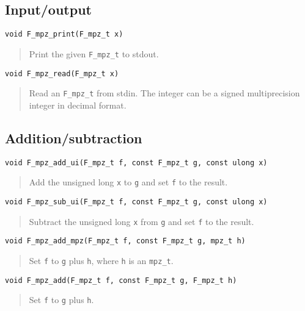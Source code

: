 \documentclass[a4paper,10pt]{article}
\newcommand{\code}{\lstinline}
\begin{document}
\subsection{Input/output}

\begin{lstlisting}
void F_mpz_print(F_mpz_t x)
\end{lstlisting}
\begin{quote}
Print the given \code{F_mpz_t} to stdout.
\end{quote}

\begin{lstlisting}
void F_mpz_read(F_mpz_t x)
\end{lstlisting}
\begin{quote}
Read an \code{F_mpz_t} from stdin. The integer can be a signed multiprecision integer in decimal format.
\end{quote}

\subsection{Addition/subtraction}

\begin{lstlisting}
void F_mpz_add_ui(F_mpz_t f, const F_mpz_t g, const ulong x)
\end{lstlisting}
\begin{quote}
Add the unsigned long \code{x} to \code{g} and set \code{f} to the result.
\end{quote}

\begin{lstlisting}
void F_mpz_sub_ui(F_mpz_t f, const F_mpz_t g, const ulong x)
\end{lstlisting}
\begin{quote}
Subtract the unsigned long \code{x} from \code{g} and set \code{f} to the result.
\end{quote}

\begin{lstlisting}
void F_mpz_add_mpz(F_mpz_t f, const F_mpz_t g, mpz_t h)
\end{lstlisting}
\begin{quote}
Set \code{f} to \code{g} plus \code{h}, where \code{h} is an \code{mpz_t}. 
\end{quote}

\begin{lstlisting}
void F_mpz_add(F_mpz_t f, const F_mpz_t g, F_mpz_t h)
\end{lstlisting}
\begin{quote}
Set \code{f} to \code{g} plus \code{h}. 
\end{quote}
\end{document}
